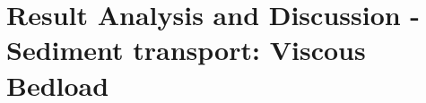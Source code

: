 
\chapter{Result Analysis and Discussion - Sediment transport: Viscous Bedload}
\label{chap:Resultados-CFD}


